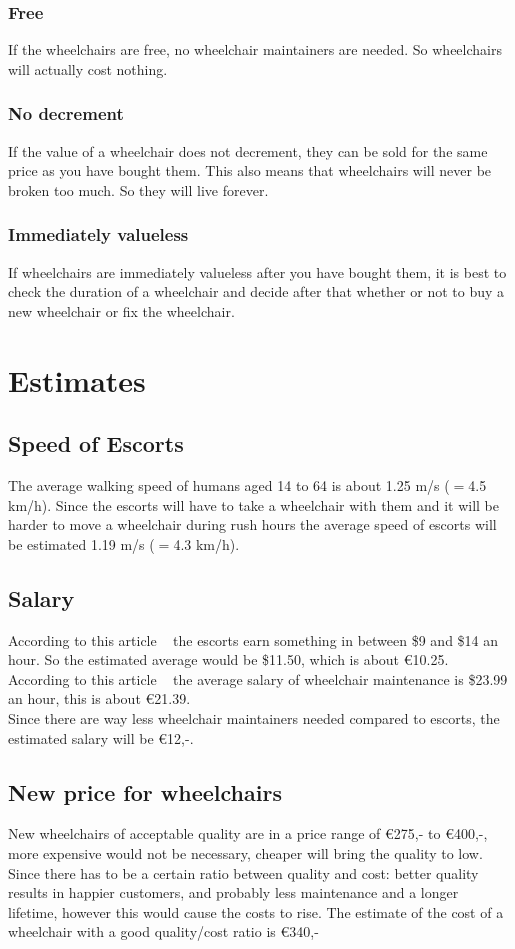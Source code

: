 \documentclass[a4paper, 11pt, notitlepage]{report}
\begin{document}
\subsection{Free}
If the wheelchairs are free, no wheelchair maintainers are needed. So wheelchairs will actually cost nothing.
\subsection{No decrement}
If the value of a wheelchair does not decrement, they can be sold for the same price as you have bought them. This also means that wheelchairs will never be broken too much. So they will live forever.
\subsection{Immediately valueless}
If wheelchairs are immediately valueless after you have bought them, it is best to check the duration of a wheelchair and decide after that whether or not to buy a new wheelchair or fix the wheelchair.
\chapter{Estimates}
    \section{Speed of Escorts}
    The average walking speed of humans aged 14 to 64 is about 1.25 m/s  ($=$4.5 km/h). Since the escorts will have to take a wheelchair with them and it will be harder to move a wheelchair during rush hours the average speed of escorts will be estimated 1.19 m/s ($=$4.3 km/h).
    \section{Salary}
    According to this article ~\cite{ref1} the escorts earn something in between \$9 and \$14 an hour. So the estimated average would be \$11.50, which is about \euro{10.25}.\\
    According to this article ~\cite{ref2} the average salary of wheelchair maintenance is \$23.99 an hour, this is about \euro{21.39}.\\
    Since there are way less wheelchair maintainers needed compared to escorts, the estimated salary will be \euro{12,-}.
    \section{New price for wheelchairs}
    New wheelchairs of acceptable quality are in a price range of \euro{275,-} to \euro{400,-}, more expensive would not be necessary, cheaper will bring the quality to low. Since there has to be a certain ratio between quality and cost: better quality results in happier customers, and probably less maintenance and a longer lifetime, however this would cause the costs to rise. The estimate of the cost of a wheelchair with a good quality/cost ratio is \euro{340,-}
\end{document}
